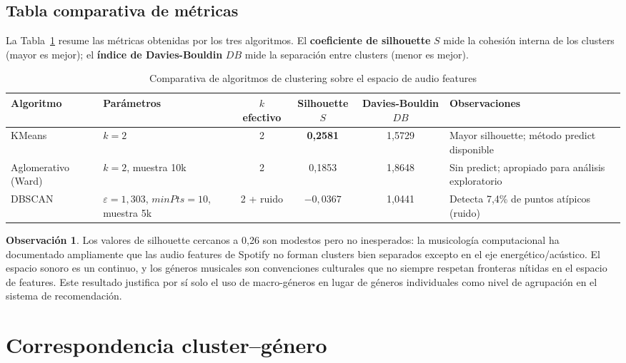 \documentclass[12pt, a4paper]{book}
\theoremstyle{definition}
\newtheorem{observacion}{Observación}[chapter]
\begin{document}
\subsection{Tabla comparativa de métricas}
\label{sec:tabla_clustering}

La Tabla~\ref{tab:clustering_metricas} resume las métricas obtenidas por
los tres algoritmos. El \textbf{coeficiente de silhouette} $S$ mide la
cohesión interna de los clusters (mayor es mejor); el \textbf{índice de
Davies-Bouldin} $DB$ mide la separación entre clusters (menor es mejor).

\begin{table}[H]
\centering
\caption{Comparativa de algoritmos de clustering sobre el espacio de audio features}
\label{tab:clustering_metricas}
\small
\begin{tabular}{llcccp{3.5cm}}
\toprule
\textbf{Algoritmo} & \textbf{Parámetros} & \textbf{$k$ efectivo} &
\textbf{Silhouette $S$} & \textbf{Davies-Bouldin $DB$} & \textbf{Observaciones} \\
\midrule
KMeans & $k=2$ & 2 & \textbf{0{,}2581} & 1{,}5729 &
  Mayor silhouette; método predict disponible \\
Aglomerativo (Ward) & $k=2$, muestra 10k & 2 & 0{,}1853 & 1{,}8648 &
  Sin predict; apropiado para análisis exploratorio \\
DBSCAN & $\varepsilon=1{,}303$, $\textit{minPts}=10$, muestra 5k & 2 + ruido &
  $-0{,}0367$ & 1{,}0441 &
  Detecta 7{,}4\% de puntos atípicos (ruido) \\
\bottomrule
\end{tabular}
\end{table}

\begin{observacion}
Los valores de silhouette cercanos a 0{,}26 son modestos pero no
inesperados: la musicología computacional ha documentado ampliamente que las
audio features de Spotify no forman clusters bien separados excepto en el
eje energético/acústico. El espacio sonoro es un continuo, y los géneros
musicales son convenciones culturales que no siempre respetan fronteras
nítidas en el espacio de features. Este resultado justifica por sí solo el
uso de macro-géneros en lugar de géneros individuales como nivel de
agrupación en el sistema de recomendación.
\end{observacion}

\section{Correspondencia cluster–género}
\label{sec:cluster_genero}
\end{document}
